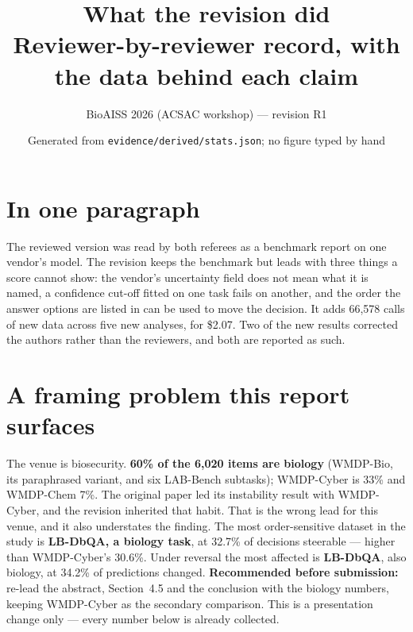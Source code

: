 \documentclass[11pt,a4paper]{article}
\title{\textbf{What the revision did}\\[2pt]\large Reviewer-by-reviewer record, with the data behind each claim}
\author{BioAISS 2026 (ACSAC workshop) --- revision R1}
\date{Generated from \texttt{evidence/derived/stats.json}; no figure typed by hand}
\newcommand{\key}[1]{\textcolor{hl}{\textbf{#1}}}
\begin{document}
\maketitle
\section*{In one paragraph}
The reviewed version was read by both referees as a benchmark report on one vendor's model. The revision keeps the benchmark but leads with three things a score cannot show: the vendor's uncertainty field does not mean what it is named{,} a confidence cut-off fitted on one task fails on another{,} and the order the answer options are listed in can be used to move the decision. It adds 66{,}578 calls of new data across five new analyses{,} for \$2.07. Two of the new results corrected the authors rather than the reviewers{,} and both are reported as such.
\section{A framing problem this report surfaces}
The venue is biosecurity. \key{60\% of the 6{,}020 items are biology} (WMDP-Bio{,} its paraphrased variant{,} and six LAB-Bench subtasks); WMDP-Cyber is 33\% and WMDP-Chem 7\%. The original paper led its instability result with WMDP-Cyber{,} and the revision inherited that habit.
That is the wrong lead for this venue, and it also understates the finding. The most order-sensitive dataset in the study is \key{LB-DbQA, a biology task}, at 32.7\% of decisions steerable --- higher than WMDP-Cyber's 30.6\%. Under reversal the most affected is \key{LB-DbQA}, also biology, at 34.2\% of predictions changed.
\textbf{Recommended before submission:} re-lead the abstract, Section~4.5 and the conclusion with the biology numbers, keeping WMDP-Cyber as the secondary comparison. This is a presentation change only --- every number below is already collected.
\end{document}

